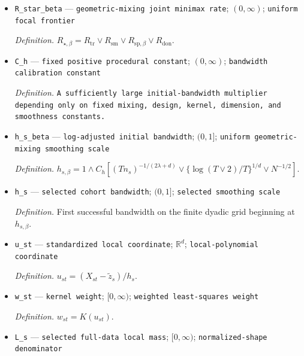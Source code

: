 \documentclass{article}
\begin{document}
\begin{itemize}
  \par\smallskip\noindent\emph{Definition.} \(R_q\) equals respectively \(R_{\mathrm{tr}},R_{\mathrm{sm}},R_{\mathrm{sp},\beta},R_{\mathrm{don}}\) for \(q=\mathrm{tr},\mathrm{sm},\mathrm{sp},\mathrm{don}\).
  \item \texttt{R\_\allowbreak{}star\_\allowbreak{}beta} --- \texttt{geometric-\allowbreak{}mixing joint minimax rate}; \((0,\infty)\); \texttt{uniform focal frontier}
  \par\smallskip\noindent\emph{Definition.} \(R_{\star,\beta}=R_{\mathrm{tr}}\vee R_{\mathrm{sm}}\vee R_{\mathrm{sp},\beta}\vee R_{\mathrm{don}}\).
  \item \texttt{C\_\allowbreak{}h} --- \texttt{fixed positive procedural constant}; \((0,\infty)\); \texttt{bandwidth calibration constant}
  \par\smallskip\noindent\emph{Definition.} \texttt{A sufficiently large initial-\allowbreak{}bandwidth multiplier depending only on fixed mixing,\allowbreak{} design,\allowbreak{} kernel,\allowbreak{} dimension,\allowbreak{} and smoothness constants.}
  \item \texttt{h\_\allowbreak{}s\_\allowbreak{}beta} --- \texttt{log-\allowbreak{}adjusted initial bandwidth}; \((0,1]\); \texttt{uniform geometric-\allowbreak{}mixing smoothing scale}
  \par\smallskip\noindent\emph{Definition.} \(h_{s,\beta}=1\wedge C_h[(Tn_s)^{-1/(2\lambda+d)}\vee\{\log(T\vee2)/T\}^{1/d}\vee N^{-1/2}]\).
  \item \texttt{h\_\allowbreak{}s} --- \texttt{selected cohort bandwidth}; \((0,1]\); \texttt{selected smoothing scale}
  \par\smallskip\noindent\emph{Definition.} First successful bandwidth on the finite dyadic grid beginning at \(h_{s,\beta}\).
  \item \texttt{u\_\allowbreak{}st} --- \texttt{standardized local coordinate}; \(\mathbb R^d\); \texttt{local-\allowbreak{}polynomial coordinate}
  \par\smallskip\noindent\emph{Definition.} \(u_{st}=(X_{st}-\widetilde z_s)/h_s\).
  \item \texttt{w\_\allowbreak{}st} --- \texttt{kernel weight}; \([0,\infty)\); \texttt{weighted least-\allowbreak{}squares weight}
  \par\smallskip\noindent\emph{Definition.} \(w_{st}=K(u_{st})\).
  \item \texttt{L\_\allowbreak{}s} --- \texttt{selected full-\allowbreak{}data local mass}; \([0,\infty)\); \texttt{normalized-\allowbreak{}shape denominator}

\end{itemize}
\end{document}
